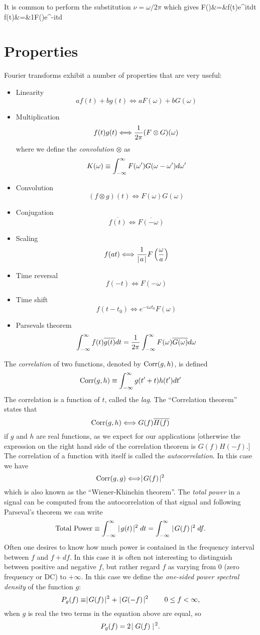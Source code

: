 It is common to perform the substitution $\nu={\omega/2\pi}$ which
gives
\bua
F(\omega)&=&\infint f(t)e^{i\omega t}dt \\
f(t)&=&{1\pi}\infint F(\omega)e^{-i\omega t}d\omega
\eua

\section{Properties}

Fourier transforms exhibit a number of properties that are very
useful:
\begin{itemize}
\item Linearity \[ af(t)+bg(t)\Longleftrightarrow
  aF(\omega)+bG(\omega) \]
\item Multiplication \[ f(t)g(t)\Longleftrightarrow{1\over
    2\pi}(F\otimes G)(\omega) \]
where we define the {\it convolution} $\otimes$ as \[
K(\omega)\equiv\int_{-\infty}^{\infty} F(\omega')G(\omega-\omega')d\omega' \]
\item Convolution \[ (f\otimes g)(t)\Longleftrightarrow
  F(\omega)G(\omega) \]
\item Conjugation \[ \overline{f(t)}\Longleftrightarrow\overline{F(-\omega)} \]
\item Scaling \[ f(at) \Longleftrightarrow {1\over
    \mid\!a\!\mid}F\left({\omega\over a}\right) \]
 \item Time reversal \[ f(-t) \Longleftrightarrow F(-\omega) \]
\item Time shift \[ f(t-t_0) \Longleftrightarrow e^{-i\omega
    t_0}F(\omega) \]
\item Parsevals theorem \[ \int_{-\infty}^{\infty} f(t)\overline{g(t)}dt = {1\over
    2\pi}\int_{-\infty}^{\infty} F(\omega)\overline{G(\omega)}d\omega \]
\end{itemize}

The {\it correlation} of two functions, denoted by ${\rm Corr}(g,h)$, is defined
\[
{\rm Corr}(g,h)\equiv\int_{-\infty}^\infty g(t'+t)h(t')dt'
\]
The correlation is a function of $t$, called the {\it lag}. The ``Correlation theorem'' states that 
\[ {\rm Corr}(g,h) \Longleftrightarrow  G(f)\overline{H(f)} \]
if $g$ and $h$ are real functions, as we expect for our applications [otherwise the expression on 
the right hand side of the correlation theorem is $G(f)H(-f)$.] The correlation of a function with itself is called the {\it autocorrelation}. In this case we have 
\[ {\rm Corr}(g,g) \Longleftrightarrow  \mid\! G(f)\!\mid^2 \]
which is also known as the ``Wiener-Khinchin theorem''. The {\it total power} in a signal
can be computed from the autocorrelation of that signal and following Parseval's theorem
we can write
\[ {\rm Total~Power}\equiv\int_{-\infty}^{\infty}\mid\! g(t)\!\mid^2dt
  =\int_{-\infty}^{\infty}\mid\! G(f)\!\mid^2df.
\]
Often one desires to know how much power is contained in the frequency interval between $f$ and $f+df$. In this case it is often not
interesting to distinguish  between positive and negative $f$, but rather regard $f$ as varying from $0$ (zero frequency or DC) to $+\infty$. In this case we define the {\it one-sided power spectral density} of the function $g$:
\[ P_g(f) \equiv \mid\! G(f)\!\mid^2+\mid\! G(-f)\!\mid^2\qquad 0\le f<\infty,\]
when $g$ is real the two terms in the equation above are equal, so 
\[ P_g(f)=2\!\mid G(f)\mid\!^2.\]
